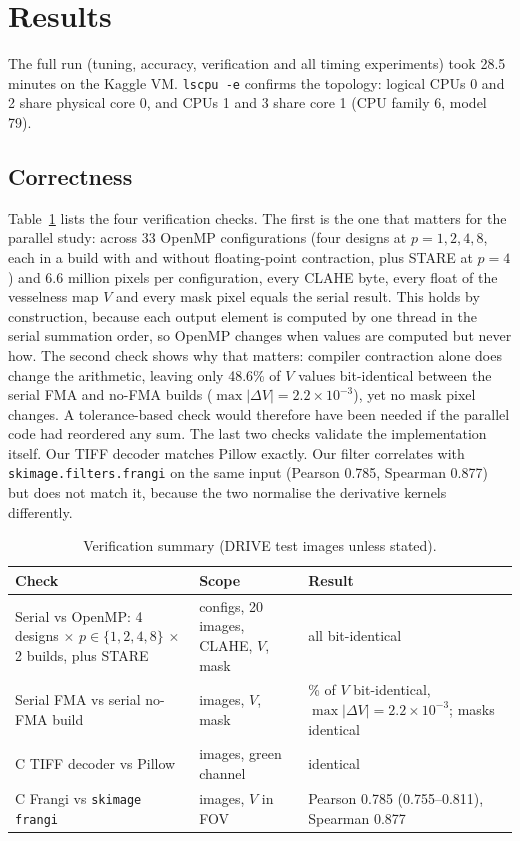 \section{Results}\label{sec:results}

The full run (tuning, accuracy, verification and all timing experiments) took 28.5 minutes on the Kaggle VM.
\texttt{lscpu -e} confirms the topology: logical CPUs 0 and 2 share physical core 0, and CPUs 1 and 3 share
core 1 (CPU family 6, model 79).

\subsection{Correctness}
Table~\ref{tab:correct} lists the four verification checks. The first is the one that matters for the
parallel study: across 33 OpenMP configurations (four designs at $p=1,2,4,8$, each in a build with and without
floating-point contraction, plus STARE at $p=4$) and 6.6 million pixels per configuration, every CLAHE byte,
every float of the vesselness map $V$ and every mask pixel equals the serial result. This holds by
construction, because each output element is computed by one thread in the serial summation order, so
OpenMP changes when values are computed but never how. The second check shows why that matters: compiler
contraction alone does change the arithmetic, leaving only 48.6\% of $V$ values bit-identical between the
serial FMA and no-FMA builds ($\max|\Delta V|=2.2\times10^{-3}$), yet no mask pixel changes. A tolerance-based
check would therefore have been needed if the parallel code had reordered any sum. The last two checks
validate the implementation itself. Our TIFF decoder matches Pillow exactly. Our filter correlates with
\texttt{skimage.\allowbreak filters.\allowbreak frangi} on the same input (Pearson 0.785, Spearman 0.877) but
does not match it, because the two normalise the derivative kernels differently.

\begin{table}[t]
\centering
\caption{Verification summary (DRIVE test images unless stated).}\label{tab:correct}
\footnotesize
\setlength{\tabcolsep}{3pt}
\begin{tabular}{@{}>{\raggedright\arraybackslash}p{}>{\raggedright\arraybackslash}p{}>{\raggedright\arraybackslash}p{}@{}}
\toprule
Check & Scope & Result \\
\midrule
Serial vs OpenMP: 4 designs $\times$ $p\in\{1,2,4,8\}$ $\times$ 2 builds, plus STARE & 33 configs, 20 images, CLAHE, $V$, mask & all bit-identical \\
\addlinespace
Serial FMA vs serial no-FMA build & 20 images, $V$, mask & 48.6\% of $V$ bit-identical, $\max|\Delta V|=2.2\times10^{-3}$; masks identical \\
\addlinespace
C TIFF decoder vs Pillow & 3 images, green channel & identical \\
\addlinespace
C Frangi vs \texttt{skimage} \texttt{frangi} & 4 images, $V$ in FOV & Pearson 0.785 (0.755--0.811), Spearman 0.877 \\
\bottomrule
\end{tabular}
\end{table}

